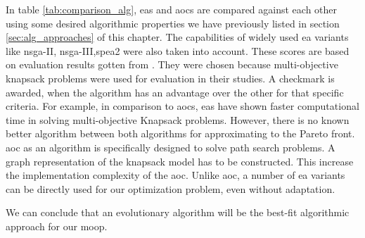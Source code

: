 In table \ref{tab:comparison_alg}, \glspl{ea} and \glspl{aoc} are compared against each other using some desired algorithmic properties we have previously listed in section \ref{sec:alg_approaches} of this chapter. The capabilities of widely used \gls{ea} variants like \gls{nsga}-II, \gls{nsga}-III,\gls{spea}2 were also taken into account. These scores are based on evaluation results gotten from \parencite{Lust2012TheApproach, Florios2010SolvingAlgorithms, Alaya2007AntProblems}. They were chosen because multi-objective knapsack problems were used for evaluation in their studies. A checkmark is awarded, when the algorithm has an advantage over the other for that specific criteria. For example, in comparison to \glspl{aoc}, \glspl{ea} have shown faster computational time in solving multi-objective Knapsack problems. However, there is no known better algorithm between both algorithms for approximating to the Pareto front. \Gls{aoc} as an algorithm is specifically designed to solve path search problems. A graph representation of the knapsack model has to be constructed. This increase the implementation complexity of the \gls{aoc}. Unlike \gls{aoc}, a number of \gls{ea} variants can be directly used for our optimization problem, even without adaptation.

We can conclude that an evolutionary algorithm will be the best-fit algorithmic approach for our \gls{moop}.



 



 